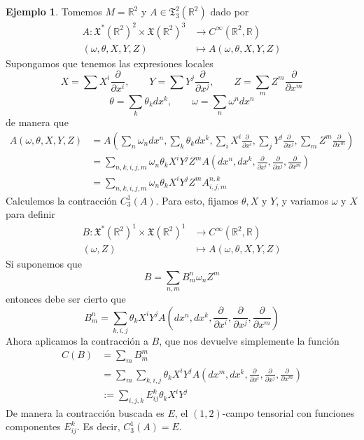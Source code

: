 \documentclass[spanish]{book}
\theoremstyle{definition}
\newtheorem*{ejem}{Ejemplo}
\newcommand{\R}{\mathbb{R}}
\newcommand{\T}{\mathfrak{T}}
\newcommand{\Cinf}{C^\infty}
\begin{document}
	\begin{ejem}
		Tomemos $M=\R^2$ y $A\in\T^2_3(\R^2)$ dado por
			\begin{align*}
			A:\mathfrak{X}^*(\R^2)^2\times\mathfrak{X}(\R^2)^3&\to\Cinf(\R^2,\R)\\
			(\omega,\theta,X,Y,Z)&\mapsto A(\omega,\theta,X,Y,Z)
		\end{align*}
		Supongamos que tenemos las expresiones locales
		\[X=\sum X^i\frac{\partial}{\partial x^i},\qquad Y=\sum Y^j\frac{\partial}{\partial x^j},\qquad Z=\sum_mZ^m\frac{\partial}{\partial x^m}\]\[ \theta=\sum_k\theta_k dx^k,\qquad \omega=\sum_n\omega^ndx^n\]
		de manera que
		\begin{align*}
			A(\omega,\theta,X,Y,Z)&=A\left(\sum_n\omega_ndx^n,\sum_k\theta_k dx^k,\sum_iX^i\frac{\partial}{\partial x^i},\sum_jY^j\frac{\partial}{\partial x^j},\sum_mZ^m\frac{\partial}{\partial x^m}\right)\\
			&=\sum_{n,k,i,j,m}\omega_n\theta_kX^iY^jZ^mA\left(dx^n,dx^k,\frac{\partial}{\partial x^i},\frac{\partial}{\partial x^j},\frac{\partial}{\partial x^m}\right)\\
			&=\sum_{n,k,i,j,m}\omega_n\theta_kX^iY^jZ^mA^{n,k}_{i,j,m}
		\end{align*}
		Calculemos la contracción $C^1_3(A)$. Para esto, fijamos $\theta,X$ y $Y$, y variamos $\omega$ y $X$ para definir
		\begin{align*}
			B:\mathfrak{X}^*(\R^2)^1\times\mathfrak{X}(\R^2)^1&\to\Cinf(\R^2,\R)\\
			(\omega,Z)&\mapsto A(\omega,\theta,X,Y,Z)
		\end{align*}
		Si suponemos que
		\[B=\sum_{n,m} B^n_m\omega_nZ^m\]
		entonces debe ser cierto que
		\[B^n_m=\sum_{k,i,j}\theta_kX^iY^jA\left(dx^n,dx^k,\frac{\partial}{\partial x^i},\frac{\partial}{\partial x^j},\frac{\partial}{\partial x^m}\right)\]
		Ahora aplicamos la contracción a $B$, que nos devuelve simplemente la función
		\begin{align*}C(B)&=\sum_mB^m_m\\
			&=\sum_m\sum_{k,i,j}\theta_kX^iY^jA\left(dx^m,dx^k,\frac{\partial}{\partial x^i},\frac{\partial}{\partial x^j},\frac{\partial}{\partial x^m}\right)\\
			&:=\sum_{i,j,k}E^k_{ij}\theta_kX^iY^j
		\end{align*}
		De manera la contracción buscada es $E$, el $(1,2)$-campo tensorial con funciones componentes $E^k_{ij}$. Es decir, $C^1_3(A)=E$.
	\end{ejem}
	
\end{document}
